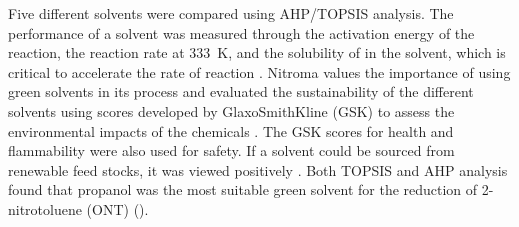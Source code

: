 Five different solvents were compared using AHP/TOPSIS analysis. The performance of a solvent was measured through the activation energy of the reaction, the reaction rate at \SI{333}{\K}, and the solubility of  in the solvent, which is critical to accelerate the rate of reaction \cite{rajadhyaksha_solvent_1986}. Nitroma values the importance of using green solvents in its process and evaluated the sustainability of the different solvents using scores developed by GlaxoSmithKline (GSK) to assess the environmental impacts of the chemicals \cite{henderson_expanding_2011}. The GSK scores for health and flammability were also used for safety. If a solvent could be sourced from renewable feed stocks, it was viewed positively \cite{byrne_tools_2016}. Both TOPSIS and AHP analysis found that propanol was the most suitable green solvent for the reduction of 2-nitrotoluene (ONT) ().


